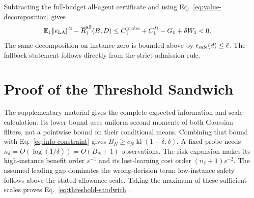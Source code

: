 Subtracting the full-budget all-agent certificate and using Eq.~\eqref{eq:value-decomposition} gives
\begin{equation}
\mathbb{E}_1\|e_{\rm LA}\|^2-\overline R_1^{\rm all}(B,D)
\le C_1^{\rm probe}+C_1^D-G_1+\delta W_1<0.
\end{equation}
The same decomposition on instance zero is bounded above by $\epsilon_{\rm safe}(d)\le\bar\epsilon$.
The fallback statement follows directly from the strict admission rule.

\section{Proof of the Threshold Sandwich}
\label{app:threshold}
The supplementary material gives the complete expected-information and scale calculation.
Its lower bound uses uniform second moments of both Gaussian filters, not a pointwise bound on their conditional means.
Combining that bound with Eq.~\eqref{eq:info-constraint} gives $B_N\ge c_N\operatorname{kl}(1-\delta,\delta)$.
A fixed probe needs $n_\delta=O(\log(1/\delta))=O(B_N+1)$ observations.
The risk expansion makes its high-instance benefit order $s^{-1}$ and its lost-learning cost order $(n_\delta+1)s^{-2}$.
The assumed leading gap dominates the wrong-decision term; low-instance safety follows above the stated allowance scale.
Taking the maximum of these sufficient scales proves Eq.~\eqref{eq:threshold-sandwich}.

